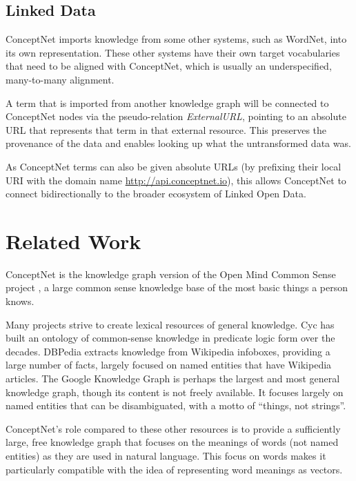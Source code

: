 \documentclass[letterpaper]{article}
\begin{document}
\subsection{Linked Data}

ConceptNet imports knowledge from some other systems, such as WordNet, into its
own representation. These other systems have their own target vocabularies that
need to be aligned with ConceptNet, which is usually an underspecified,
many-to-many alignment.

A term that is imported from another knowledge graph will be connected to
ConceptNet nodes via the pseudo-relation \emph{ExternalURL}, pointing to an
absolute URL that represents that term in that external resource.  This
preserves the provenance of the data and enables looking up what the
untransformed data was.

As ConceptNet terms can also be given absolute URLs (by prefixing their local
URI with the domain name \url{http://api.conceptnet.io}), this allows
ConceptNet to connect bidirectionally to the broader ecosystem of Linked Open
Data.

\section{Related Work}

ConceptNet is the knowledge graph version of the Open Mind
Common Sense project \cite{singh2002omcs}, a large common sense knowledge base
of the most basic things a person knows.

Many projects strive to create lexical resources of general knowledge.  Cyc
\cite{lenat1989cyc} has built an ontology of common-sense knowledge in
predicate logic form over the decades. DBPedia \cite{auer2007dbpedia} extracts
knowledge from Wikipedia infoboxes, providing a large number of facts, largely
focused on named entities that have Wikipedia articles. The Google Knowledge
Graph \cite{singhal2012googleblog} is perhaps the largest and most general
knowledge graph, though its content is not freely available. It focuses largely
on named entities that can be disambiguated, with a motto of ``things, not
strings''.

ConceptNet's role compared to these other resources is to provide a
sufficiently large, free knowledge graph that focuses on the meanings of words
(not named entities) as they are used in natural language. This focus on words
makes it particularly compatible with the idea of representing word meanings as
vectors.
\end{document}
